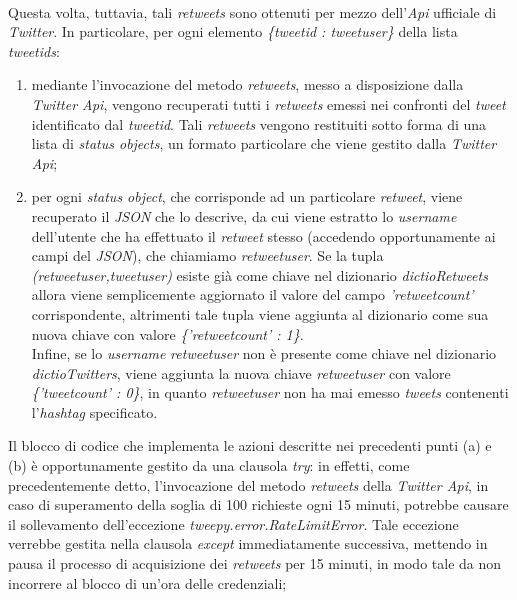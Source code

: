 \begin{enumerate}
\\Questa volta, tuttavia, tali \textit{retweets} sono ottenuti per mezzo dell'\textit{Api} ufficiale di \textit{Twitter}. In particolare, per ogni elemento \textit{\{tweetid : tweetuser\}} della lista \textit{tweetids}:
\begin{enumerate}
\item mediante l'invocazione del metodo \textit{retweets}, messo a disposizione dalla \textit{Twitter Api}, vengono recuperati tutti i \textit{retweets} emessi nei confronti del \textit{tweet} identificato dal \textit{tweetid}. Tali \textit{retweets} vengono restituiti sotto forma di una lista di \textit{status objects}, un formato particolare che viene gestito dalla \textit{Twitter Api};
\item per ogni \textit{status object}, che corrisponde ad un particolare \textit{retweet}, viene recuperato il \textit{JSON} che lo descrive, da cui viene estratto lo \textit{username} dell'utente che ha effettuato il \textit{retweet} stesso (accedendo opportunamente ai campi del \textit{JSON}), che chiamiamo \textit{retweetuser}. Se la tupla \textit{(retweetuser,tweetuser)} esiste già come chiave nel dizionario \textit{dictioRetweets} allora viene semplicemente aggiornato il valore del campo \textit{'retweetcount'} corrispondente, altrimenti tale tupla viene aggiunta al dizionario come sua nuova chiave con valore \textit{\{'retweetcount' : 1\}}. 
\\Infine, se lo \textit{username} \textit{retweetuser} non è presente come chiave nel dizionario \textit{dictioTwitters}, viene aggiunta la nuova chiave \textit{retweetuser} con valore \textit{\{'tweetcount' : 0\}}, in quanto \textit{retweetuser} non ha mai emesso \textit{tweets} contenenti l'\textit{hashtag} specificato.
\end{enumerate}
Il blocco di codice che implementa le azioni descritte nei precedenti punti (a) e (b) è opportunamente gestito da una clausola \textit{try}: in effetti, come precedentemente detto, l'invocazione del metodo \textit{retweets} della \textit{Twitter Api}, in caso di superamento della soglia di 100 richieste ogni 15 minuti, potrebbe causare il sollevamento dell'eccezione \textit{tweepy.error.RateLimitError}. Tale eccezione verrebbe gestita nella clausola \textit{except} immediatamente successiva, mettendo in pausa il processo di acquisizione dei \textit{retweets} per 15 minuti, in modo tale da non incorrere al blocco di un'ora delle credenziali;

\end{enumerate}
